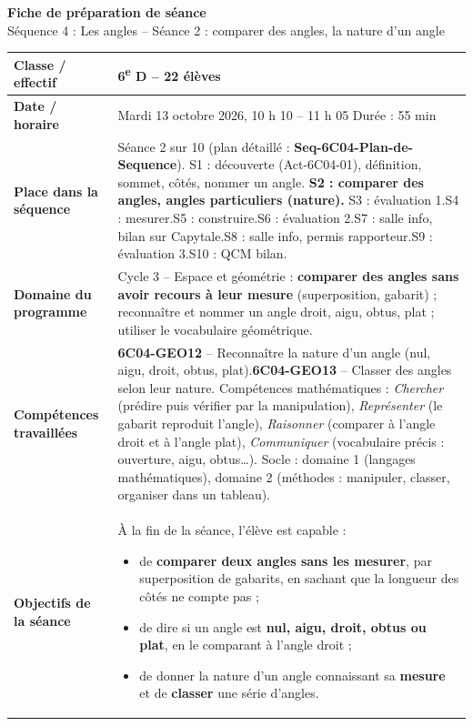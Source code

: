 \documentclass[11pt]{article}
\newcommand{\champ}[2]{\textbf{#1} & #2 \\ \hline}
\begin{document}
\begin{center}
{\Large\bfseries Fiche de préparation de séance}\\[1mm]
{\large Séquence 4 : Les angles -- Séance 2 : comparer des angles, la nature d'un angle}
\end{center}

\renewcommand{\arraystretch}{1.35}
\begin{tabularx}{\linewidth}{|>{\raggedright\arraybackslash}p{3.6cm}|X|}
\hline
\champ{Classe / effectif}{6\textsuperscript{e} D -- 22 élèves}
\champ{Date / horaire}{Mardi 13 octobre 2026, 10 h 10 -- 11 h 05 \qquad Durée : 55 min}
\champ{Place dans la séquence}{Séance 2 sur 10 (plan détaillé : \textbf{Seq-6C04-Plan-de-Sequence}).\enskip
S1 : découverte (Act-6C04-01), définition, sommet, côtés, nommer un angle.\enskip
\textbf{S2 : comparer des angles, angles particuliers (nature).}\enskip
S3 : évaluation 1.\enskip S4 : mesurer.\enskip S5 : construire.\enskip S6 : évaluation 2.\enskip S7 : salle info, bilan sur Capytale.\enskip S8 : salle info, permis rapporteur.\enskip S9 : évaluation 3.\enskip S10 : QCM bilan.}
\champ{Domaine du programme}{Cycle 3 -- Espace et géométrie : \textbf{comparer des angles sans avoir recours à leur mesure} (superposition, gabarit) ; reconnaître et nommer un angle droit, aigu, obtus, plat ; utiliser le vocabulaire géométrique.}
\champ{Compétences travaillées}{\textbf{6C04-GEO12} -- Reconnaître la nature d'un angle (nul, aigu, droit, obtus, plat).\newline \textbf{6C04-GEO13} -- Classer des angles selon leur nature.\newline
Compétences mathématiques : \textit{Chercher} (prédire puis vérifier par la manipulation), \textit{Représenter} (le gabarit reproduit l'angle), \textit{Raisonner} (comparer à l'angle droit et à l'angle plat), \textit{Communiquer} (vocabulaire précis : ouverture, aigu, obtus\ldots).\newline
Socle : domaine 1 (langages mathématiques), domaine 2 (méthodes : manipuler, classer, organiser dans un tableau).}
\champ{Objectifs de la séance}{À la fin de la séance, l'élève est capable :
\begin{itemize}[nosep,leftmargin=1.2em]
\item de \textbf{comparer deux angles sans les mesurer}, par superposition de gabarits, en sachant que la longueur des côtés ne compte pas ;
\item de dire si un angle est \textbf{nul, aigu, droit, obtus ou plat}, en le comparant à l'angle droit ;
\item de donner la nature d'un angle connaissant sa \textbf{mesure} et de \textbf{classer} une série d'angles.

\end{itemize}}
\end{tabularx}
\end{document}
